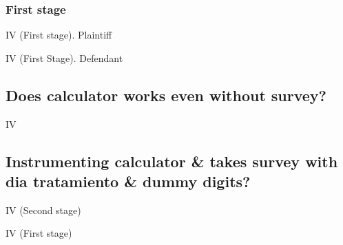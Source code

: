 \documentclass[12pt]{article}
\theoremstyle{named}
\newcommand{\folder}{C:/Users/chasi_000/Dropbox/Statistics/P10/Results/Results_2/Effect}
\begin{document}
\subsubsection*{First stage}


\begin{table}[H]\centering \caption{IV (First stage). Plaintiff}
\begin{center}
\scriptsize{}
\end{center}
\end{table}
\begin{table}[H]\centering \caption{IV (First Stage). Defendant}
\begin{center}
\scriptsize{}
\end{center}
\end{table}

\pagebreak

\subsection*{Does calculator works even without survey?}

\begin{table}[H]\centering \caption{IV}
\begin{center}
\scriptsize{}
\end{center}
\end{table}


\pagebreak

\subsection*{Instrumenting calculator \& takes survey with dia tratamiento \& dummy digits?}

\begin{table}[H]\centering \caption{IV (Second stage)}
\begin{center}
\scriptsize{}
\end{center}
\end{table}

\pagebreak

\begin{table}[H]\centering \caption{IV (First stage)}
\begin{center}
\scriptsize{}
\end{center}
\end{table}
\end{document}
